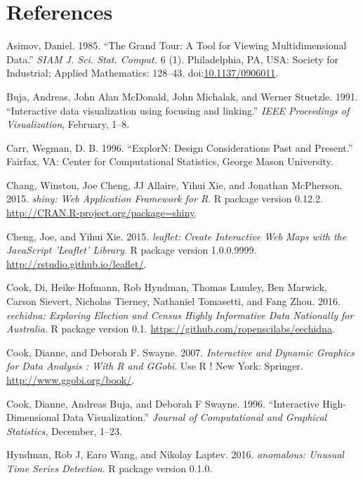 \documentclass[12pt,]{article}
\theoremstyle{definition}
\theoremstyle{definition}
\theoremstyle{remark}
\begin{document}
\section*{References}

\hypertarget{refs}{}
\hypertarget{ref-grand-tour}{}
Asimov, Daniel. 1985. ``The Grand Tour: A Tool for Viewing
Multidimensional Data.'' \emph{SIAM J. Sci. Stat. Comput.} 6 (1).
Philadelphia, PA, USA: Society for Industrial; Applied Mathematics:
128--43. doi:\href{https://doi.org/10.1137/0906011}{10.1137/0906011}.

\hypertarget{ref-Buja:1991vh}{}
Buja, Andreas, John Alan McDonald, John Michalak, and Werner Stuetzle.
1991. ``Interactive data visualization using focusing and linking.''
\emph{IEEE Proceedings of Visualization}, February, 1--8.

\hypertarget{ref-brushing-pcp}{}
Carr, Wegman, D. B. 1996. ``ExplorN: Design Considerations Past and
Present.'' Fairfax, VA: Center for Computational Statistics, George
Mason University.

\hypertarget{ref-shiny}{}
Chang, Winston, Joe Cheng, JJ Allaire, Yihui Xie, and Jonathan
McPherson. 2015. \emph{shiny: Web Application Framework for R}. R
package version 0.12.2. \url{http://CRAN.R-project.org/package=shiny}.

\hypertarget{ref-leaflet}{}
Cheng, Joe, and Yihui Xie. 2015. \emph{leaflet: Create Interactive Web
Maps with the JavaScript 'Leaflet' Library}. R package version
1.0.0.9999. \url{http://rstudio.github.io/leaflet/}.

\hypertarget{ref-eechidna}{}
Cook, Di, Heike Hofmann, Rob Hyndman, Thomas Lumley, Ben Marwick, Carson
Sievert, Nicholas Tierney, Nathaniel Tomasetti, and Fang Zhou. 2016.
\emph{eechidna: Exploring Election and Census Highly Informative Data
Nationally for Australia}. R package version 0.1.
\url{https://github.com/ropenscilabs/eechidna}.

\hypertarget{ref-ggobi:2007}{}
Cook, Dianne, and Deborah F. Swayne. 2007. \emph{Interactive and Dynamic
Graphics for Data Analysis : With R and GGobi}. Use R ! New York:
Springer. \url{http://www.ggobi.org/book/}.

\hypertarget{ref-Cook:2007uk}{}
Cook, Dianne, Andreas Buja, and Deborah F Swayne. 1996. ``Interactive
High-Dimensional Data Visualization.'' \emph{Journal of Computational
and Graphical Statistics}, December, 1--23.

\hypertarget{ref-anomalous}{}
Hyndman, Rob J, Earo Wang, and Nikolay Laptev. 2016. \emph{anomalous:
Unusual Time Series Detection}. R package version 0.1.0.
\end{document}
